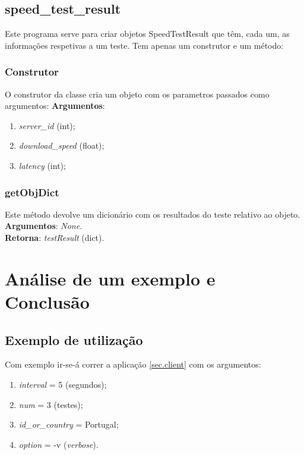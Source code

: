 \documentclass{report}
\begin{document}
\section{speed\_test\_result}
Este programa serve para criar objetos SpeedTestResult que têm, cada um, as informações respetivas a um teste. Tem apenas um construtor e um método:
\subsection{Construtor}
O construtor da classe cria um objeto com os parametros passados como argumentos:
\textbf{Argumentos}:
\begin{enumerate}
\item \textit{server\_id} (int);
\item \textit{download\_speed} (float);
\item \textit{latency} (int);
\end{enumerate}

\subsection{getObjDict}
Este método devolve um dicionário com os resultados do teste relativo ao objeto.
\textbf{Argumentos}: \textit{None}.\\
\textbf{Retorna}: \textit{testResult} (dict).
\chapter{Análise de um exemplo e Conclusão}
\label{chap:analiseconclusao}
\section{Exemplo de utilização}
\label{sec:example}
Com exemplo ir-se-á correr a aplicação \autoref{sec.client} com os argumentos:
\begin{enumerate}
\item \textit{interval} = 5 (segundos);
\item \textit{num} = 3 (testes);
\item \textit{id\_or\_country} = Portugal;
\item \textit{option} = -v (\textit{verbose}).
\end{enumerate}
\end{document}
